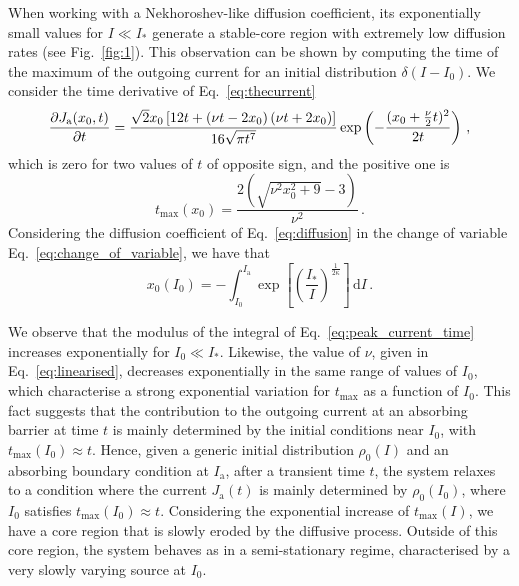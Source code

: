 When working with a Nekhoroshev-like diffusion coefficient, its exponentially small values for $I \ll I_\ast$ generate a stable-core region with extremely low diffusion rates (see Fig.~\ref{fig:1}). This observation can be shown by computing the time of the maximum of the outgoing current for an initial distribution $\delta(I - I_0)$. We consider the time derivative of Eq.~\eqref{eq:thecurrent}
\begin{equation}
\pdv{J_\mathrm{a}(x_0, t)}{t} = \frac{\sqrt{2} x_0 \left[12 t + \left(\nu t - 2 x_0\right) \left(\nu t + 2 x_0\right)\right] }{16 \sqrt{\pi t^7}}\exp\left(-\frac{(x_0+\frac{\nu}{2}t)^2}{2t}\right)\,,
\end{equation}
which is zero for two values of $t$ of opposite sign, and the positive one is
\begin{equation}
    t_{\text{max}}(x_0) = \frac{2 \left(\sqrt{\nu^{2} x_0^{2} + 9} - 3\right)}{\nu^{2}}\,.
    \label{eq:taumax}
\end{equation}
Considering the diffusion coefficient of Eq.~\eqref{eq:diffusion} in the change of variable Eq.~\eqref{eq:change_of_variable}, we have that
\begin{equation}
    x_0(I_0) = {-}\int_{I_0}^{I_\mathrm{a}} \exp\left[\left(\frac{I_\ast}{I}\right)^{\frac{1}{2\kappa}}\right]\,\mathrm{d}I\,.
    \label{eq:peak_current_time}
\end{equation}

We observe that the modulus of the integral of Eq.~\eqref{eq:peak_current_time} increases exponentially for $I_0 \ll I_\ast$. Likewise, the value of $\nu$, given in Eq.~\eqref{eq:linearised}, decreases exponentially in the same range of values of $I_0$, which characterise a strong exponential variation for $t_\text{max}$ as a function of $I_0$. This fact suggests that the contribution to the outgoing current at an absorbing barrier at time $t$ is mainly determined by the initial conditions near $I_0$, with $t_\text{max}(I_0) \approx t$. Hence, given a generic initial distribution $\rho_0(I)$ and an absorbing boundary condition at $I_\mathrm{a}$, after a transient time $t$, the system relaxes to a condition where the current $J_\mathrm{a}(t)$ is mainly determined by $\rho_0(I_0)$, where $I_0$ satisfies $t_\text{max}(I_0) \approx t$. Considering the exponential increase of $t_\text{max}(I)$, we have a core region that is slowly eroded by the diffusive process. Outside of this core region, the system behaves as in a semi-stationary regime, characterised by a very slowly varying source at $I_0$.

